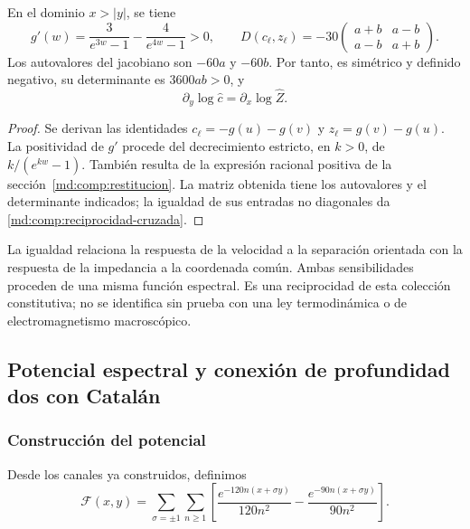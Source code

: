 \begin{proposition}
\label{md:comp:prop-reciprocidad}
En el dominio \(x>|y|\), se tiene
\begin{equation}
 g'(w)=\frac{3}{e^{3w}-1}-\frac{4}{e^{4w}-1}>0,
 \qquad
 D(c_\ell,z_\ell)=-30
 \begin{pmatrix}a+b&a-b\\a-b&a+b\end{pmatrix}.
 \label{md:comp:jacobiano}
\end{equation}
Los autovalores del jacobiano son \(-60a\) y \(-60b\). Por tanto, es
simétrico y definido negativo, su determinante es \(3600ab>0\), y
\begin{equation}
 \boxed{\partial_y\log\widehat c=\partial_x\log\widehat Z.}
 \label{md:comp:reciprocidad-cruzada}
\end{equation}
\end{proposition}
\begin{proof}
Se derivan las identidades
\(c_\ell=-g(u)-g(v)\) y \(z_\ell=g(v)-g(u)\).
La positividad de \(g'\) procede del decrecimiento estricto, en \(k>0\),
de \(k/(e^{kw}-1)\). También resulta de la expresión racional positiva
de la sección~\ref{md:comp:restitucion}. La matriz obtenida tiene los
autovalores y el determinante indicados; la igualdad de sus entradas
no diagonales da \eqref{md:comp:reciprocidad-cruzada}.
\end{proof}

La igualdad relaciona la respuesta de la velocidad a la separación
orientada con la respuesta de la impedancia a la coordenada común.
Ambas sensibilidades proceden de una misma función espectral. Es una
reciprocidad de esta colección constitutiva; no se identifica sin prueba
con una ley termodinámica o de electromagnetismo macroscópico.

\subsection{Potencial espectral y conexión de profundidad dos con Catalán}
\label{md:comp:potencial}

\subsubsection{Construcción del potencial}
\label{md:comp:construccion-potencial}

Desde los canales ya construidos, definimos
\begin{equation}
 \mathscr F(x,y)=\sum_{\sigma=\pm1}\sum_{n\geq1}
 \left[
 \frac{e^{-120n(x+\sigma y)}}{120n^2}
 -\frac{e^{-90n(x+\sigma y)}}{90n^2}
 \right].
 \label{md:comp:serie-potencial}
\end{equation}

